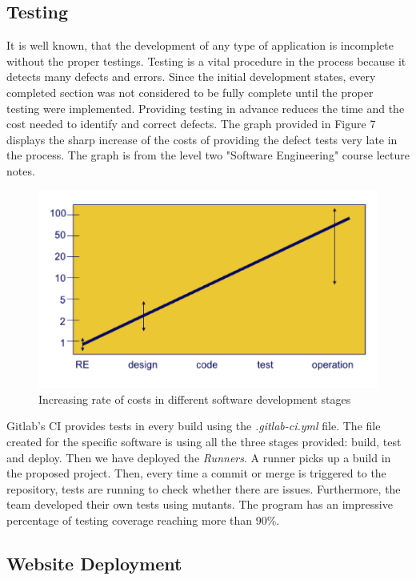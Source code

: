 \documentclass{l3proj}
\begin{document}
\subsection{Testing}
\label{testing}

It is well known, that the development of any type of application is incomplete without the proper testings. Testing is a vital procedure in the process because it detects many defects and errors. Since the initial development states, every completed section was not considered to be fully complete until the proper testing were implemented. Providing testing in advance reduces the time and the cost needed to identify and correct defects. The graph provided in Figure 7 displays the sharp increase of the costs of providing the defect tests very late in the process. The graph is from the level two "Software Engineering" course lecture notes.

\begin{figure}
 \centerline{\includegraphics[width=\textwidth, height=\textheight, keepaspectratio]{costOfErrors.png}}
 \caption{Increasing rate of costs in different software development stages }
\end{figure}

Gitlab's CI provides tests in every build using the \textit{.gitlab-ci.yml} file. The file created for the specific software is using all the three stages provided: build, test and deploy. Then we have deployed the \textit{Runners}. A runner picks up a build in the proposed project. Then, every time a commit or merge is triggered to the repository, tests are running to check whether there are issues. Furthermore, the team developed their own tests using mutants. The program has an impressive percentage of testing coverage reaching more than 90\%.
\subsection{Website Deployment}
\label{sec:deployment}
\end{document}
